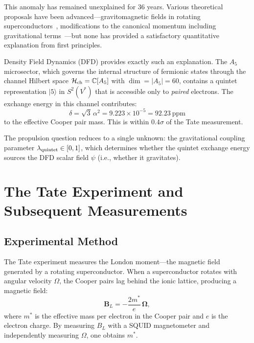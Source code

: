 \documentclass[12pt,a4paper]{article}
\theoremstyle{definition}
\theoremstyle{remark}
\begin{document}
This anomaly has remained unexplained for 36 years.  Various theoretical proposals
have been advanced---gravitomagnetic fields in rotating superconductors~\cite{Tajmar2006},
modifications to the canonical momentum including gravitational
terms~\cite{DeWitt1966}---but none has provided a satisfactory quantitative explanation
from first principles.

Density Field Dynamics (DFD) provides exactly such an explanation.  The $A_5$
microsector, which governs the internal structure of fermionic states through the
channel Hilbert space $\mathcal{H}_{\rm ch} = \mathbb{C}[A_5]$ with
$\dim = |A_5| = 60$, contains a quintet representation $|5\rangle$ in $S^2(V^*)$
that is accessible only to \emph{paired} electrons.  The exchange energy in this
channel contributes:
\begin{equation}\label{eq:delta_DFD}
\boxed{\delta = \sqrt{3}\,\alpha^2 = 9.223 \times 10^{-5} = 92.23~\text{ppm}}
\end{equation}
to the effective Cooper pair mass.  This is within $0.4\sigma$ of the Tate
measurement.

The propulsion question reduces to a single unknown: the gravitational coupling
parameter $\lambda_{\rm quintet} \in [0,1]$, which determines whether the quintet
exchange energy sources the DFD scalar field $\psi$ (i.e., whether it gravitates).

\section{The Tate Experiment and Subsequent Measurements}\label{sec:tate}

\subsection{Experimental Method}

The Tate experiment measures the London moment---the magnetic field generated by
a rotating superconductor.  When a superconductor rotates with angular velocity
$\Omega$, the Cooper pairs lag behind the ionic lattice, producing a magnetic field:
\begin{equation}\label{eq:london}
\mathbf{B}_L = -\frac{2m^*}{e}\,\boldsymbol{\Omega},
\end{equation}
where $m^*$ is the effective mass per electron in the Cooper pair and $e$ is the
electron charge.  By measuring $B_L$ with a SQUID magnetometer and independently
measuring $\Omega$, one obtains $m^*$.
\end{document}
